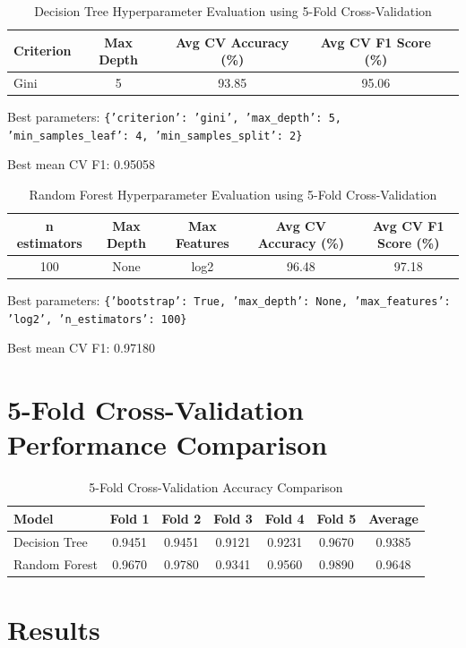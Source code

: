 \documentclass[12pt,a4paper]{article}
\begin{document}
\begin{table}[H]\centering
\caption{Decision Tree Hyperparameter Evaluation using 5-Fold Cross-Validation}
\begin{tabular}{lcccc}
\toprule
Criterion & Max Depth & Avg CV Accuracy (\%) & Avg CV F1 Score (\%)\\
\midrule
Gini & 5 & 93.85 & 95.06\\
\bottomrule
\end{tabular}
\end{table}

Best parameters:
\texttt{\{'criterion': 'gini', 'max\_depth': 5, 'min\_samples\_leaf': 4, 'min\_samples\_split': 2\}}

Best mean CV F1: 0.95058

\begin{table}[H]\centering
\caption{Random Forest Hyperparameter Evaluation using 5-Fold Cross-Validation}
\begin{tabular}{ccccc}
\toprule
n estimators & Max Depth & Max Features & Avg CV Accuracy (\%) & Avg CV F1 Score (\%)\\
\midrule
100 & None & log2 & 96.48 & 97.18\\
\bottomrule
\end{tabular}
\end{table}

Best parameters:
\texttt{\{'bootstrap': True, 'max\_depth': None, 'max\_features': 'log2', 'n\_estimators': 100\}}

Best mean CV F1: 0.97180


\section{5-Fold Cross-Validation Performance Comparison} \begin{table}[H]\centering \caption{5-Fold Cross-Validation Accuracy Comparison} \begin{tabular}{lcccccc} \toprule Model & Fold 1 & Fold 2 & Fold 3 & Fold 4 & Fold 5 & Average\\ \midrule Decision Tree & 0.9451 & 0.9451 & 0.9121 & 0.9231 & 0.9670 & 0.9385\\ Random Forest & 0.9670 & 0.9780 & 0.9341 & 0.9560 & 0.9890 & 0.9648\\ \bottomrule \end{tabular} \end{table}

\section{Results}
\end{document}
